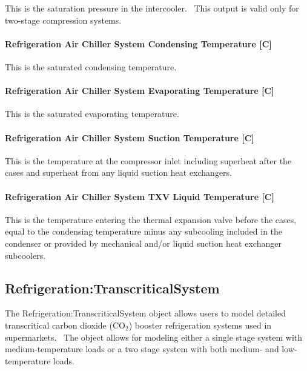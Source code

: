 This is the saturation pressure in the intercooler.~ This output is valid only for two-stage compression systems.

\paragraph{Refrigeration Air Chiller System Condensing Temperature {[}C{]}}\label{refrigeration-air-chiller-system-condensing-temperature-c}

This is the saturated condensing temperature.

\paragraph{Refrigeration Air Chiller System Evaporating Temperature {[}C{]}}\label{refrigeration-air-chiller-system-evaporating-temperature-c}

This is the saturated evaporating temperature.

\paragraph{Refrigeration Air Chiller System Suction Temperature {[}C{]}}\label{refrigeration-air-chiller-system-suction-temperature-c}

This is the temperature at the compressor inlet including superheat after the cases and superheat from any liquid suction heat exchangers.

\paragraph{Refrigeration Air Chiller System TXV Liquid Temperature {[}C{]}}\label{refrigeration-air-chiller-system-txv-liquid-temperature-c}

This is the temperature entering the thermal expansion valve before the cases, equal to the condensing temperature minus any subcooling included in the condenser or provided by mechanical and/or liquid suction heat exchanger subcoolers.

\subsection{Refrigeration:TranscriticalSystem}\label{refrigerationtranscriticalsystem}

The Refrigeration:TranscriticalSystem object allows users to model detailed transcritical carbon dioxide (CO\(_{2}\)) booster refrigeration systems used in supermarkets.~ The object allows for modeling either a single stage system with medium-temperature loads or a two stage system with both medium- and low-temperature loads.

